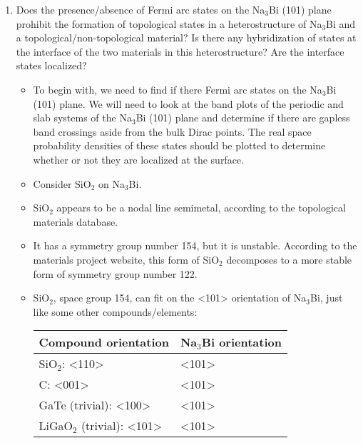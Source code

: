 \documentclass[english]{article}
\begin{document}
\begin{enumerate}
\begin{itemize}
    \end{itemize}
    
    \item Does the presence/absence of Fermi arc states on the Na$_{3}$Bi (101) plane prohibit the formation of topological states in a heterostructure of Na$_{3}$Bi and a topological/non-topological material?  Is there any hybridization of states at the interface of the two materials in this heterostructure?  Are the interface states localized?
    
       \begin{itemize}
          \item To begin with, we need to find if there Fermi arc states on the Na$_{3}$Bi (101) plane.  We will need to look at the band plots of the periodic and slab systems of the Na$_{3}$Bi (101) plane and determine if there are gapless band crossings aside from the bulk Dirac points.  The real space probability densities of these states should be plotted to determine whether or not they are localized at the surface.    
            
          \item Consider SiO$_2$ on Na$_3$Bi.
    
           \item  SiO$_2$ appears to be a nodal line semimetal, according to the topological materials database.
           
           \item It has a symmetry group number 154, but it is unstable.  According to the materials project website, this form of SiO$_2$ decomposes to a more stable form of symmetry group number 122.
           
           \item SiO$_2$, space group 154, can fit on the <101> orientation of Na$_3$Bi, just like some other compounds/elements:
           
            \begin{center}
            \begin{tabular}{ | m{4cm} | m{4cm} | } 
            \hline
            Compound orientation & Na$_{3}$Bi orientation \\ 
            \hline
            SiO$_2$: <110> & <101> \\
            \hline
            C: <001> & <101>\\
            \hline
            GaTe (trivial): <100> & <101>\\
            \hline
            LiGaO$_2$ (trivial): <101> & <101>\\
            \hline
            \end{tabular}
            \end{center}
           

\end{itemize}
\end{enumerate}
\end{document}
